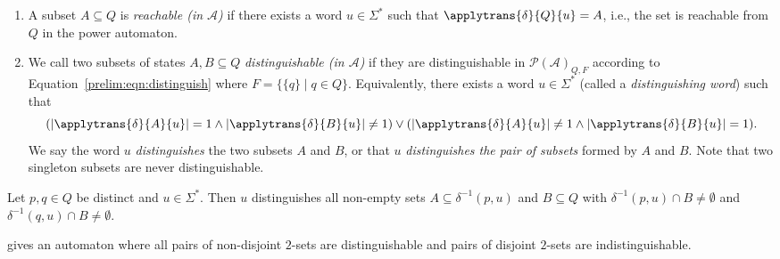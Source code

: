 \begin{enumerate}
	\item A subset $A \subseteq Q$
	is \emph{reachable (in $\mathcal A$)} if there exists a word $u \in \Sigma^*$
	such that $\applytrans{\delta}{Q}{u} = A$, i.e., the set is reachable from $Q$ 
	in the power automaton. 
	
	\item We call two subsets of states $A, B \subseteq Q$
	\emph{distinguishable (in $\mathcal A$)}
	if they are distinguishable 
	in $\mathcal P(\mathcal A)_{Q, F}$ according to Equation~\eqref{prelim:eqn:distinguish}
	where $F = \{ \{q\} \mid q \in Q \}$. Equivalently,
	there exists a word $u \in \Sigma^*$ (called a \emph{distinguishing word}) 
	such that 
	\begin{equation}\label{eqn:distininguish}
		( |\applytrans{\delta}{A}{u}| = 1 \land 
		|\applytrans{\delta}{B}{u}| \ne 1 ) \lor 
		( |\applytrans{\delta}{A}{u}| \ne 1 \land 
		|\applytrans{\delta}{B}{u}| = 1 ).
	\end{equation}
	We say the word $u$ \emph{distinguishes} the two subsets $A$ and $B$, or that $u$ \emph{distinguishes the pair of subsets} formed by $A$ and $B$.
	Note that two singleton subsets are never distinguishable.	
\end{enumerate} 

\begin{remark}
	Let $p,q \in Q$ be distinct and $u \in \Sigma^*$.
	Then $u$ distinguishes all non-empty sets $A \subseteq \delta^{-1}(p, u)$
	and $B \subseteq Q$ with $\delta^{-1}(p, u) \cap B \ne \emptyset$
	and $\delta^{-1}(q, u) \cap B \ne \emptyset$.
\end{remark}

gives an automaton where all pairs of non-disjoint $2$-sets are distinguishable
and pairs of disjoint $2$-sets are indistinguishable.

